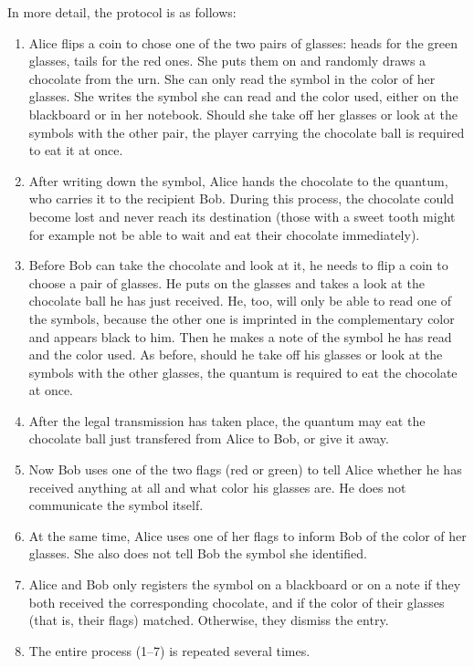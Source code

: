 \documentclass[prb,amssymb,preprint]{revtex4}
\begin{document}
In more detail, the protocol is as follows:

\begin{enumerate}

\item Alice flips a coin to chose one of the two pairs of glasses: heads
for the green glasses, tails for the red ones. She puts them on and randomly
draws a chocolate from the urn. She can only read the symbol in the color
of her glasses.  She
writes the symbol she can read and the color used, either on the blackboard
or in her notebook. Should she take off her glasses or look at
the symbols with the other pair, the player carrying the chocolate ball
is required to eat it
at once.

\item After writing down the symbol, Alice hands the chocolate to the
quantum, who carries it to the recipient Bob. During this process,
the chocolate could become lost and never reach its destination (those with
a sweet tooth might for example not be able to wait and eat their chocolate
immediately).

\item Before Bob can take the chocolate and look at it, he needs to
flip a coin to choose a pair of glasses. He puts on the glasses and takes a
look at the chocolate ball he has just received. He, too, will only be able
to read one of the symbols, because the other one is imprinted in the
complementary color and appears black to him. Then he makes a note of the
symbol he has read and the color used. As before, should he take off his
glasses or look at the symbols with the other glasses, the quantum is
required to eat the chocolate at once.

\item After the legal transmission has taken place, the quantum may eat the
chocolate ball just transfered from Alice to Bob, or give it away.

\item Now Bob uses one of the two flags (red or green) to tell Alice whether
he has received anything at all and what color his glasses are. He does not
communicate the symbol itself.

\item At the same time, Alice uses one of her flags to inform Bob of the
color of her glasses. She also does not tell Bob the symbol she identified.

\item
Alice and Bob only registers the symbol on a blackboard or on a note
if they both received the corresponding chocolate, and if the
color of their glasses (that is, their flags) matched. Otherwise, they
dismiss the entry.

\item The entire process (1--7) is repeated several times.
\end{enumerate}
\end{document}
